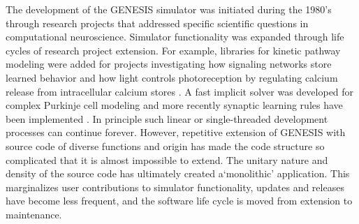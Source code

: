 \documentclass[10pt]{article}
\begin{document}
The development of the GENESIS simulator was initiated during
the 1980's through research projects that addressed specific
scientific questions in computational neuroscience. Simulator functionality was
expanded through life cycles of research project extension.
For example, libraries for kinetic pathway modeling were added for
projects investigating how signaling networks store learned
behavior \cite{bhalla99:_emerg} and how light controls photoreception by regulating calcium release from
intracellular calcium stores \cite{blackwell00:_eviden_distin_light_induc_calcium}.
A fast implicit solver was developed for
complex Purkinje cell modeling \cite{deschutter94:_purkin_i,
  deschutter94:_purkin_ii} and more recently synaptic learning rules
have been
implemented \cite{guenay08:_chann_densit_distr_explain_spikin}.  In
principle such linear or single-threaded development processes can
continue forever.  However, repetitive extension of GENESIS
with source code of diverse functions and origin has
made the code structure so complicated that it is almost impossible to extend.  The unitary nature and density of
the source code has ultimately created a`monolithic' application.
This marginalizes user contributions to simulator functionality, updates and releases have become less frequent,
and the software life cycle is moved from extension to maintenance.

\end{document}

